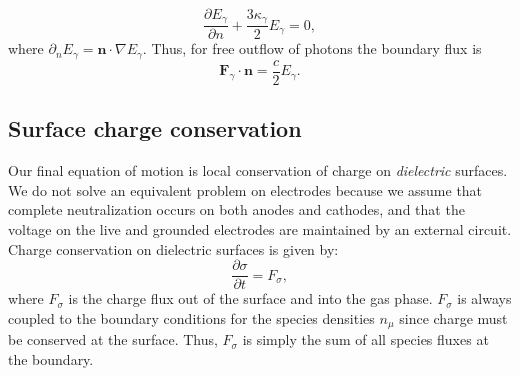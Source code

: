 \documentclass[3p]{elsarticle}
\begin{document}
\begin{equation}
  \frac{\partial E_\gamma}{\partial n} + \frac{3\kappa_\gamma}{2}E_\gamma = 0,
\end{equation}
where $\partial_n E_\gamma = \bm{n}\cdot\nabla E_\gamma$. Thus, for free outflow of photons the boundary flux is
\begin{equation}
  \label{eq:photon_outflux}
  \bm{F}_\gamma\cdot\bm{n} = \frac{c}{2} E_\gamma. 
\end{equation}

  
\subsection{Surface charge conservation}
Our final equation of motion is local conservation of charge on \emph{dielectric} surfaces. We do not solve an equivalent problem on electrodes because we assume that complete neutralization occurs on both anodes and cathodes, and that the voltage on the live and grounded electrodes are maintained by an external circuit. Charge conservation on dielectric surfaces is given by:
\begin{equation}
  \label{eq:surfaceCons} 
  \frac{\partial \sigma}{\partial t} = F_\sigma,
\end{equation}
where $F_\sigma$ is the charge flux out of the surface and into the gas phase. $F_\sigma$ is always coupled to the boundary conditions for the species densities $n_\mu$ since charge must be conserved at the surface. Thus, $F_\sigma$ is simply the sum of all species fluxes at the boundary. 



\end{document}
